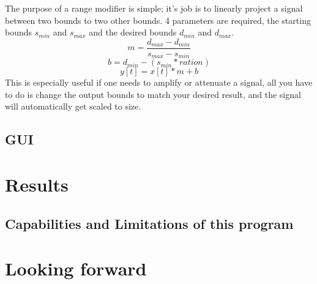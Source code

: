 \documentclass[11pt,a4paper]{article}
\begin{document}
The purpose of a range modifier is simple; it's job is to linearly project a signal between two bounds to two other bounds. 4 parameters are required, the starting bounds $s_{min}$ and $s_{max}$ and the desired bounds $d_{min}$ and $d_{max}$.
\begin{equation}
m = \frac{d_{max} - d_{min}}{s_{max} - s_{min}}
\end{equation}
\begin{equation}
b = d_{min} - (s_{min} * ration)
\end{equation}
\begin{equation}
y[t] = x[t]*m + b
\end{equation}
This is especially useful if one needs to amplify or attenuate a signal, all you have to do is change the output bounds to match your desired result, and the signal will automatically get scaled to size.

\subsection{GUI}

\clearpage

\section{Results}

\subsection{Capabilities and Limitations of this program}

\section{Looking forward}


\end{document}

